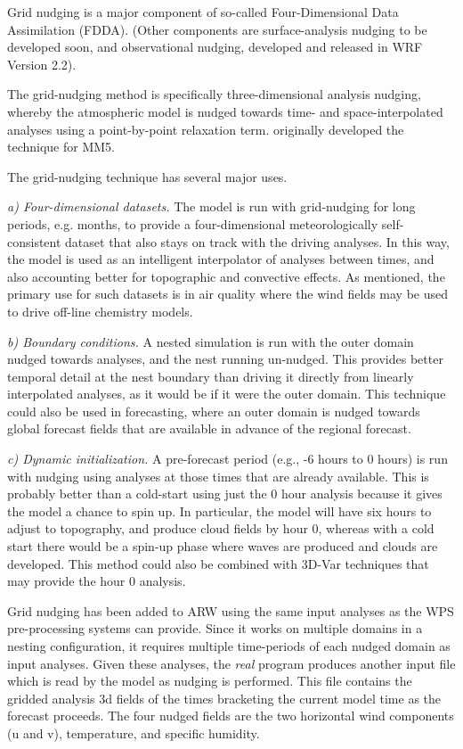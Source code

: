 Grid nudging is a major component of so-called Four-Dimensional Data Assimilation (FDDA). (Other components are surface-analysis nudging to be developed soon, and observational nudging, developed and released in WRF Version 2.2).

The grid-nudging method is specifically three-dimensional analysis nudging, whereby the atmospheric model is nudged towards time- and space-interpolated analyses using a point-by-point relaxation term. \citet{stauffer90} originally developed the technique for MM5.

The grid-nudging technique has several major uses.

{\it a) Four-dimensional datasets.} The model is run with grid-nudging for long periods, e.g. months, to provide a four-dimensional meteorologically self-consistent dataset that also stays on track with the driving analyses. In this way, the model is used as an intelligent interpolator of analyses between times, and also accounting better for topographic and convective effects. As mentioned, the primary use for such datasets is in air quality where the wind fields may be used to drive off-line chemistry models.

{\it b) Boundary conditions.} A nested simulation is run with the outer domain nudged towards analyses, and the nest running un-nudged. This provides better temporal detail at the nest boundary than driving it directly from linearly interpolated analyses, as it would be if it were the outer domain. This technique could also be used in forecasting, where an outer domain is nudged towards global forecast fields that are available in advance of the regional forecast.

{\it c) Dynamic initialization.} A pre-forecast period (e.g., -6 hours to 0 hours) is run with nudging using analyses at those times that are already available. This is probably better than a cold-start using just the 0 hour analysis because it gives the model a chance to spin up. In particular, the model will have six hours to adjust to topography, and produce cloud fields by hour 0, whereas with a cold start there would be a spin-up phase where waves are produced and clouds are developed. This method could also be combined with 3D-Var techniques that may provide the hour 0 analysis.

Grid nudging has been added to ARW using the same input analyses as the WPS pre-processing systems can provide. Since it works on multiple domains in a nesting configuration, it requires multiple time-periods of each nudged domain as input analyses. Given these analyses, the {\it real} program produces another input file which is read by the model as nudging is performed. This file contains the gridded analysis 3d fields of the times bracketing the current model time as the forecast proceeds. The four nudged fields are the two horizontal wind components (u and v), temperature, and specific humidity. 

